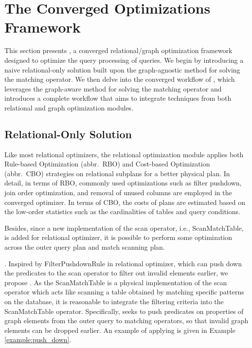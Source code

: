 \section{The Converged Optimizations Framework}
\label{sec:optimizations}

This section presents \name, a converged relational/graph optimization framework designed to optimize the query
processing of \spjm queries. We begin by introducing a naive relational-only solution built upon the graph-agnostic
method for solving the matching operator. We then delve into the converged workflow of \name, which leverages the graph-aware method for solving the matching operator and introduces a complete workflow that aims to integrate techniques from both relational and graph optimization modules.

\subsection{Relational-Only Solution}

Like most relational optimizers, the relational optimization module applies both Rule-based Optimization (abbr.~RBO) and Cost-based Optimization (abbr.~CBO) strategies on relational subplans for a better physical plan.
In detail, in terms of RBO, commonly used optimizations such as filter pushdown, join order optimization, and removal of unused columns are employed in the converged optimizer.
In terms of CBO, the costs of plans are estimated based on the low-order statistics such as the cardinalities of tables and query conditions.

Besides, since a new implementation of the scan operator, i.e., ScanMatchTable, is added for relational optimizer, it is possible to perform some optimization across the outer query plan and match scanning plan.

\filterrule.
Inspired by FilterPushdownRule in relational optimizer, which can push down the predicates to the scan operator to filter out invalid elements earlier, we propose \filterrule.
As the ScanMatchTable is a physical implementation of the scan operator which acts like scanning a table obtained by matching specific patterns on the database, it is reasonable to integrate the filtering criteria into the ScanMatchTable operator.
Specifically, \filterrule seeks to push predicates on properties of graph elements from the outer query to matching operators, so that invalid graph elements can be dropped earlier.
An example of applying \filterrule is given in Example \ref{example:push_down}.

